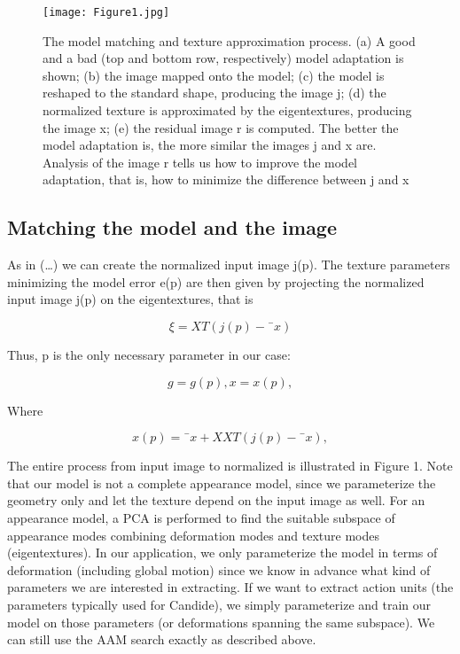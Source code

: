 \documentclass[12pt]{spieman}  %
\begin{document}
\begin{spacing}{2}
\begin{figure}[H]
    \centering
    \texttt{[image: Figure1.jpg]}
    \caption{The model matching and texture approximation process. (a) A good and a bad (top and bottom row, respectively) model adaptation is shown; (b) the image mapped onto the model; (c) the model is reshaped to the standard shape, producing the image j; (d) the normalized texture is approximated by the eigentextures, producing the image x; (e) the residual image r is computed. The better the model adaptation is, the more similar the images j and x are. Analysis of the image r tells us how to improve the model adaptation, that is, how to minimize the difference between j and x}
\end{figure}



\subsection{Matching the model and the image}{}As in (…) we can create the normalized input image j(p). The texture parameters minimizing the model error e(p) are then given by projecting the normalized input image j(p) on the eigentextures, that is


\begin{equation}
    \xi = XT (j(p)- ¯x)
\end{equation}

Thus, p is the only necessary parameter in our case:

\begin{equation}
    g = g(p), x = x(p),
\end{equation}

Where

\begin{equation}
    x(p)= ¯x+ XXT (j(p)- ¯x),
\end{equation}


The entire process from input image to normalized is illustrated in Figure 1. Note that our model is not a complete appearance model, since we parameterize the geometry only and let the texture depend on the input image as well. For an appearance model, a PCA is performed to find the suitable subspace of appearance modes combining deformation modes and texture modes (eigentextures). In our application, we only parameterize the model in terms of deformation (including global motion) since we know in advance what kind of parameters we are interested in extracting. If we want to extract action units (the parameters typically used for Candide), we simply parameterize and train our model on those parameters (or deformations spanning the same subspace). We can still use the AAM search exactly as described above.


\end{spacing}
\end{document}
